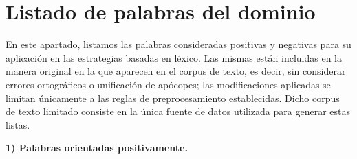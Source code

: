 \appendix
\chapter{Listado de palabras del dominio}\label{Anexos}

En este apartado, listamos las palabras consideradas positivas y negativas para su aplicaci\'on en las estrategias basadas en l\'exico. Las mismas est\'an incluidas en la manera original en la que aparecen en el corpus de texto, es decir, sin considerar errores ortogr\'aficos o unificaci\'on de ap\'ocopes; las modificaciones aplicadas se limitan \'unicamente a las reglas de preprocesamiento establecidas. Dicho corpus de texto limitado consiste en la \'unica fuente de datos utilizada para generar estas listas.
\newline

\textbf{1) Palabras orientadas positivamente.}
\newline

